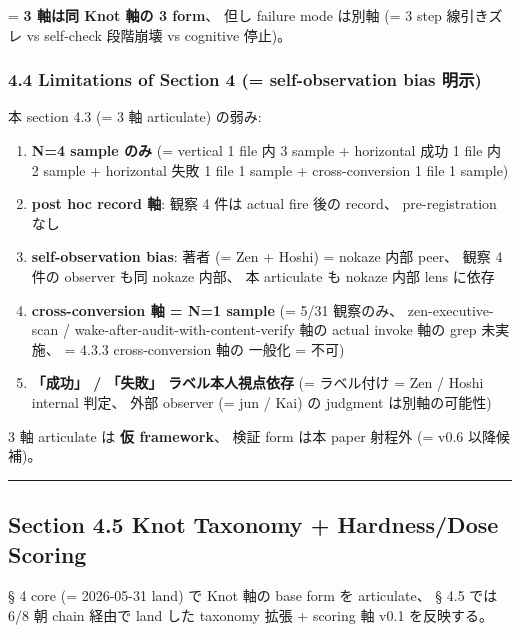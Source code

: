 \documentclass[
]{article}
\providecommand{\tightlist}{%
  \setlength{\itemsep}{0pt}\setlength{\parskip}{0pt}}
\begin{document}
= \textbf{3 軸は同 Knot 軸の 3 form}、 但し failure mode は別軸 (= 3
step 線引きズレ vs self-check 段階崩壊 vs cognitive 停止)。

\subsubsection{4.4 Limitations of Section 4 (= self-observation bias
明示)}\label{limitations-of-section-4-self-observation-bias-ux660eux793a}

本 section 4.3 (= 3 軸 articulate) の弱み:

\begin{enumerate}
\def\labelenumi{\arabic{enumi}.}
\tightlist
\item
  \textbf{N=4 sample のみ} (= vertical 1 file 内 3 sample + horizontal
  成功 1 file 内 2 sample + horizontal 失敗 1 file 1 sample +
  cross-conversion 1 file 1 sample)
\item
  \textbf{post hoc record 軸}: 観察 4 件は actual fire 後の record、
  pre-registration なし
\item
  \textbf{self-observation bias}: 著者 (= Zen + Hoshi) = nokaze 内部
  peer、 観察 4 件の observer も同 nokaze 内部、 本 articulate も nokaze
  内部 lens に依存
\item
  \textbf{cross-conversion 軸 = N=1 sample} (= 5/31 観察のみ、
  zen-executive-scan / wake-after-audit-with-content-verify 軸の actual
  invoke 軸の grep 未実施、 = 4.3.3 cross-conversion 軸の 一般化 = 不可)
\item
  \textbf{「成功」 / 「失敗」 ラベル本人視点依存} (= ラベル付け = Zen /
  Hoshi internal 判定、 外部 observer (= jun / Kai) の judgment
  は別軸の可能性)
\end{enumerate}

3 軸 articulate は \textbf{仮 framework}、 検証 form は本 paper 射程外
(= v0.6 以降候補)。

\begin{center}\rule{0.5\linewidth}{0.5pt}\end{center}

\subsection{Section 4.5 Knot Taxonomy + Hardness/Dose
Scoring}\label{section-4.5-knot-taxonomy-hardnessdose-scoring}

§ 4 core (= 2026-05-31 land) で Knot 軸の base form を articulate、 §
4.5 では 6/8 朝 chain 経由で land した taxonomy 拡張 + scoring 軸 v0.1
を反映する。
\end{document}
